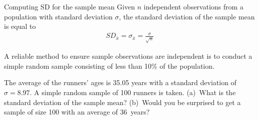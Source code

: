 \D{\newpage}

\begin{onebox}{Computing SD for the sample mean}
Given $n$ independent observations from a population with standard deviation $\sigma$, the standard deviation of the sample mean is equal to \vspace{-1mm}
\begin{eqnarray}
SD_{\bar{x}} = \sigma_{\bar{x}} =  \frac{\sigma}{\sqrt{n}}
\label{seOfXBar}
\end{eqnarray}\vspace{-3mm}

A reliable method to ensure sample observations are independent is to conduct a simple random sample consisting of less than 10\% of the population.\end{onebox}

\begin{exercisewrap}
\begin{nexercise}
The average of the runners' ages is 35.05 years with a standard deviation of $\sigma = 8.97$. A simple random sample of 100 runners is taken. (a)~What is the standard deviation of the sample mean? (b)~Would you be surprised to get a sample of size 100 with an average of 36~years?\footnotemark\end{nexercise}
\end{exercisewrap}



